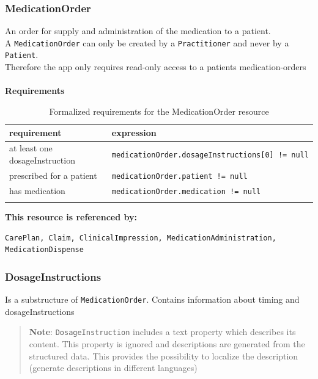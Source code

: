 \documentclass{article}
\begin{document}
\subsubsection{MedicationOrder}\label{res:medicationorder}

An order for supply and administration of the medication to a patient.
\\
A \texttt{MedicationOrder} can only be created by a
\texttt{Practitioner} and never by a \texttt{Patient}.
\\
Therefore the app only requires read-only access to a patients
medication-orders
\\
\\
\textbf{Requirements}\label{res:medicationorder:requirements}
\\
\begin{longtable}[H]{@{}ll@{}}
  \toprule
    requirement &
    expression
  \\
  \midrule
    at least one dosageInstruction &
    \texttt{medicationOrder.dosageInstructions{[}0{]}\ !=\ null}
  \\
    prescribed for a patient &
    \texttt{medicationOrder.patient\ !=\ null}
  \\
    has medication &
    \texttt{medicationOrder.medication\ !=\ null}
  \\
\bottomrule
\caption{Formalized requirements for the MedicationOrder resource}
\end{longtable}
\textbf{This resource is referenced by:}
\begin{verbatim}
CarePlan, Claim, ClinicalImpression, MedicationAdministration, MedicationDispense
\end{verbatim}

\subsubsection{DosageInstructions}\label{res:dosageinstructions}
Is a substructure of \texttt{MedicationOrder}. Contains information
about timing and dosageInstructions

\begin{quote}
\textbf{Note}: \texttt{DosageInstruction} includes a text property which
describes its content. This property is ignored and descriptions are
generated from the structured data. This provides the possibility to
localize the description (generate descriptions in different languages)
\end{quote}
\end{document}
